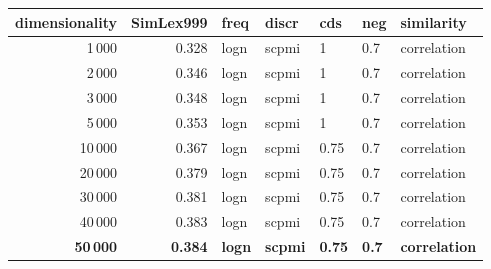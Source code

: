 \begin{tabular}{rrlllll}
\toprule
 dimensionality &  SimLex999 &  freq &  discr &   cds &  neg &   similarity \\
\midrule
           1\,000 &      0.328 &  logn &  scpmi &     1 &  0.7 &  correlation \\
           2\,000 &      0.346 &  logn &  scpmi &     1 &  0.7 &  correlation \\
           3\,000 &      0.348 &  logn &  scpmi &     1 &  0.7 &  correlation \\
           5\,000 &      0.353 &  logn &  scpmi &     1 &  0.7 &  correlation \\
          10\,000 &      0.367 &  logn &  scpmi &  0.75 &  0.7 &  correlation \\
          20\,000 &      0.379 &  logn &  scpmi &  0.75 &  0.7 &  correlation \\
          30\,000 &      0.381 &  logn &  scpmi &  0.75 &  0.7 &  correlation \\
          40\,000 &      0.383 &  logn &  scpmi &  0.75 &  0.7 &  correlation \\
          \textbf{50\,000} &      \textbf{0.384} &  \textbf{logn} &  \textbf{scpmi} &  \textbf{0.75} &  \textbf{0.7} &  \textbf{correlation} \\
\bottomrule
\end{tabular}
